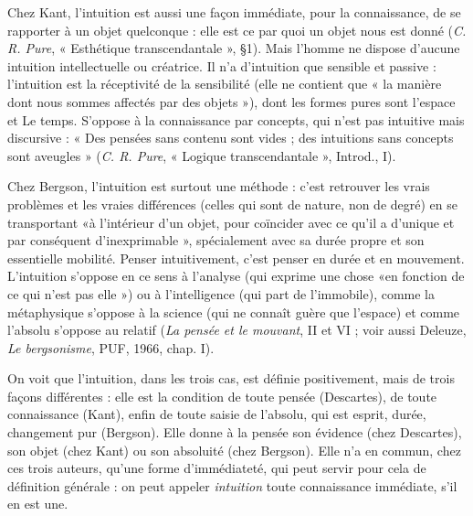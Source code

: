 {Chez Kant, l'intuition est aussi une façon immédiate, pour la connaissance,
de se rapporter à un objet quelconque : elle est ce par quoi un objet nous est
donné ({\it C. R. Pure}, « Esthétique transcendantale », \S 1). Mais l’homme ne dispose
d'aucune intuition intellectuelle ou créatrice. Il n’a d’intuition que sensible
et passive : l'intuition est la réceptivité de la sensibilité (elle ne contient
que « la manière dont nous sommes affectés par des objets »), dont les formes
pures sont l’espace et Le temps. S’oppose à la connaissance par concepts, qui
n'est pas intuitive mais discursive : « Des pensées sans contenu sont vides ; des
intuitions sans concepts sont aveugles » ({\it C. R. Pure}, « Logique transcendantale »,
Introd., I).

Chez Bergson, l'intuition est surtout une méthode : c’est retrouver les vrais
problèmes et les vraies différences (celles qui sont de nature, non de degré) en
se transportant «à l’intérieur d’un objet, pour coïncider avec ce qu'il a
d’unique et par conséquent d’inexprimable », spécialement avec sa durée
propre et son essentielle mobilité. Penser intuitivement, c’est penser en durée
et en mouvement. L’intuition s'oppose en ce sens à l’analyse (qui exprime une
chose «en fonction de ce qui n’est pas elle ») ou à l'intelligence (qui part de
l'immobile), comme la métaphysique s'oppose à la science (qui ne connaît
guère que l’espace) et comme l'absolu s'oppose au relatif ({\it La pensée et le mouvant},
II et VI ; voir aussi Deleuze, {\it Le bergsonisme}, PUF, 1966, chap. I).

On voit que l'intuition, dans les trois cas, est définie positivement, mais de
trois façons différentes : elle est la condition de toute pensée (Descartes), de
toute connaissance (Kant), enfin de toute saisie de l'absolu, qui est esprit,
durée, changement pur (Bergson). Elle donne à la pensée son évidence (chez
Descartes), son objet (chez Kant) ou son absoluité (chez Bergson). Elle n’a en
commun, chez ces trois auteurs, qu’une forme d’immédiateté, qui peut servir
pour cela de définition générale : on peut appeler {\it intuition} toute connaissance
immédiate, s’il en est une.

}
